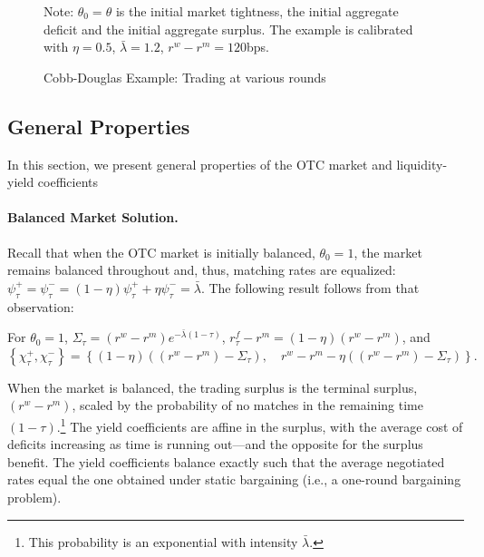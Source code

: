 \documentclass[12pt,american,english,notitlepage]{article}
\begin{document}
\begin{figure}[H]
\begin{centering}
\endminipage
\par\end{centering}
\vspace{5pt}
\caption{\label{fig:F_InterbankDay-CobbDouglas}Cobb-Douglas Example: Trading at various rounds}
\parbox[t]{1.\textwidth}{ \small{Note: $\theta_{0}=\theta$ is the initial
market tightness,  the initial aggregate deficit and the initial aggregate surplus. The example is calibrated with $\eta=0.5$,
$\bar{\lambda}=1.2$, $r^{w}-r^{m}=120$bps.}}

\end{figure}

\subsection{General Properties}

In this section, we present general properties of the OTC market and
liquidity-yield coefficients

\paragraph{Balanced Market Solution.}

Recall that when the OTC market is initially balanced, $\theta_{0}=1$, the market remains balanced throughout and, thus, matching rates are
equalized: $\psi_{\tau}^{+}=\psi_{\tau}^{-}=\left(1-\eta\right)\psi_{\tau}^{+}+\eta\psi_{\tau}^{-}=\bar{\lambda}$.
The following result follows from that observation:

\begin{corollary}\label{cor:balanced} For $\theta_{0}=1$,
 $\Sigma_{\tau}=\left(r^{w}-r^{m}\right)e^{-\bar{\lambda}\left(1-\tau\right)}$,
$r_{\tau}^{f}-r^{m}=\left(1-\eta\right)\left(r^{w}-r^{m}\right)$,
and $\left\{ \chi_{\tau}^{+},\chi_{\tau}^{-}\right\} =\left\{ \left(1-\eta\right)\left(\left(r^{w}-r^{m}\right)-\Sigma_{\tau}\right),\quad r^{w}-r^{m}-\eta\left(\left(r^{w}-r^{m}\right)-\Sigma_{\tau}\right)\right\} .$
\end{corollary}
When the market is balanced, the trading surplus is the terminal surplus, {$\left(r^{w}-r^{m}\right)$}, scaled by
the probability of no matches in the remaining time {$\left(1-\tau\right)$}.\footnote{This probability is an exponential with intensity $\bar{\lambda}$.}
The yield coefficients are affine in the surplus, with the average
cost of deficits increasing as time is running out---and the opposite for the surplus benefit. The yield coefficients balance exactly such that the average negotiated rates equal the one obtained under static
bargaining (i.e., a one-round bargaining problem).
\end{document}
